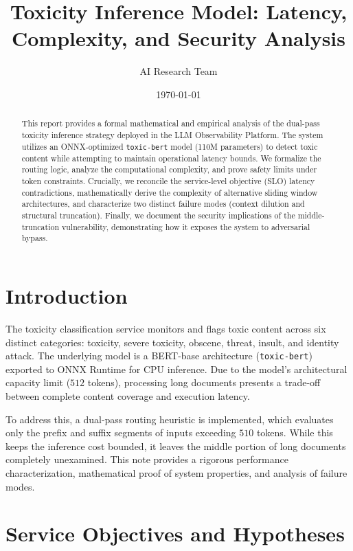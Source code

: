 \documentclass[10pt]{article}
\begin{document}
\title{\textbf{Toxicity Inference Model: Latency, Complexity, and Security Analysis}}
\author{AI Research Team}
\date{\today}
\maketitle

\begin{abstract}
This report provides a formal mathematical and empirical analysis of the dual-pass toxicity inference strategy deployed in the LLM Observability Platform. The system utilizes an ONNX-optimized \texttt{toxic-bert} model (110M parameters) to detect toxic content while attempting to maintain operational latency bounds. We formalize the routing logic, analyze the computational complexity, and prove safety limits under token constraints. Crucially, we reconcile the service-level objective (SLO) latency contradictions, mathematically derive the complexity of alternative sliding window architectures, and characterize two distinct failure modes (context dilution and structural truncation). Finally, we document the security implications of the middle-truncation vulnerability, demonstrating how it exposes the system to adversarial bypass.
\end{abstract}

\section{Introduction}
The toxicity classification service monitors and flags toxic content across six distinct categories: toxicity, severe toxicity, obscene, threat, insult, and identity attack. The underlying model is a BERT-base architecture (\texttt{toxic-bert}) exported to ONNX Runtime for CPU inference. Due to the model's architectural capacity limit ($512$ tokens), processing long documents presents a trade-off between complete content coverage and execution latency. 

To address this, a dual-pass routing heuristic is implemented, which evaluates only the prefix and suffix segments of inputs exceeding $510$ tokens. While this keeps the inference cost bounded, it leaves the middle portion of long documents completely unexamined. This note provides a rigorous performance characterization, mathematical proof of system properties, and analysis of failure modes.

\section{Service Objectives and Hypotheses}
\end{document}
